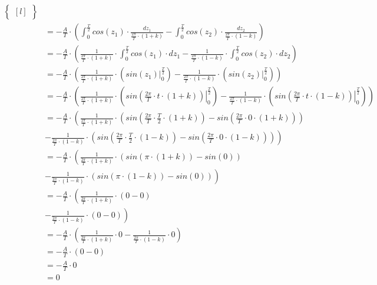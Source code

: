 \begin{task}
\begin{align*}
\begin{Bmatrix*}[l]
\end{Bmatrix*}\\
&=-\frac{A}{T} \cdot \left(\int_{0}^{\frac{T}{2}} cos\left( z_1 \right)\cdot \frac{dz_1}{\frac{2\pi}{T} \cdot \left(1+k\right)}  - \int_{0}^{\frac{T}{2}} cos\left( z_2\right) \cdot \frac{dz_2}{\frac{2\pi}{T} \cdot \left(1-k\right)}\right)\\
&=-\frac{A}{T} \cdot \left(\frac{1}{\frac{2\pi}{T}\cdot \left(1+k\right)} \cdot \int_{0}^{\frac{T}{2}} cos\left( z_1 \right)\cdot dz_1 - \frac{1}{\frac{2\pi}{T} \cdot \left(1-k\right)} \cdot \int_{0}^{\frac{T}{2}} cos\left( z_2\right) \cdot dz_2 \right)\\
&=-\frac{A}{T} \cdot \left(\frac{1}{\frac{2\pi}{T}\cdot \left(1+k\right)} \cdot \left( \left. sin\left( z_1 \right) \right|_{0}^{\frac{T}{2}} \right) - \frac{1}{\frac{2\pi}{T} \cdot \left(1-k\right)} \cdot \left(\left. sin\left( z_2\right) \right|_{0}^{\frac{T}{2}} \right) \right)\\
&=-\frac{A}{T} \cdot \left(\frac{1}{\frac{2\pi}{T}\cdot \left(1+k\right)} \cdot \left( \left. sin\left( \frac{2\pi}{T} \cdot t \cdot \left(1+k\right) \right) \right|_{0}^{\frac{T}{2}} \right) - \frac{1}{\frac{2\pi}{T} \cdot \left(1-k\right)} \cdot \left(\left. sin\left( \frac{2\pi}{T} \cdot t \cdot \left(1-k\right)\right) \right|_{0}^{\frac{T}{2}} \right) \right)\\
&=-\frac{A}{T} \cdot \left(\frac{1}{\frac{2\pi}{T}\cdot \left(1+k\right)} \cdot \left( sin\left( \frac{2\pi}{T} \cdot \frac{T}{2} \cdot \left(1+k\right) \right) - sin\left( \frac{2\pi}{T} \cdot 0 \cdot \left(1+k\right) \right) \right) \right.\\
&\left.- \frac{1}{\frac{2\pi}{T} \cdot \left(1-k\right)} \cdot \left( sin\left( \frac{2\pi}{T} \cdot \frac{T}{2} \cdot \left(1-k\right)\right) -  sin\left( \frac{2\pi}{T} \cdot 0 \cdot \left(1-k\right)\right) \right) \right)\\
&=-\frac{A}{T} \cdot \left(\frac{1}{\frac{2\pi}{T}\cdot \left(1+k\right)} \cdot \left( sin\left(\pi \cdot \left(1+k\right) \right) - sin\left( 0 \right) \right) \right.\\
&\left.- \frac{1}{\frac{2\pi}{T} \cdot \left(1-k\right)} \cdot \left( sin\left(\pi \cdot \left(1-k\right)\right) -  sin\left( 0 \right) \right) \right)\\
&=-\frac{A}{T} \cdot \left(\frac{1}{\frac{2\pi}{T}\cdot \left(1+k\right)} \cdot \left( 0 - 0 \right) \right.\\
&\left.- \frac{1}{\frac{2\pi}{T} \cdot \left(1-k\right)} \cdot \left( 0 -  0 \right) \right)\\
&=-\frac{A}{T} \cdot \left(\frac{1}{\frac{2\pi}{T}\cdot \left(1+k\right)} \cdot 0 - \frac{1}{\frac{2\pi}{T} \cdot \left(1-k\right)} \cdot 0 \right)\\
&=-\frac{A}{T} \cdot \left(0 - 0 \right)\\
&=-\frac{A}{T} \cdot 0\\
&=0
\end{align*}


\end{task}
